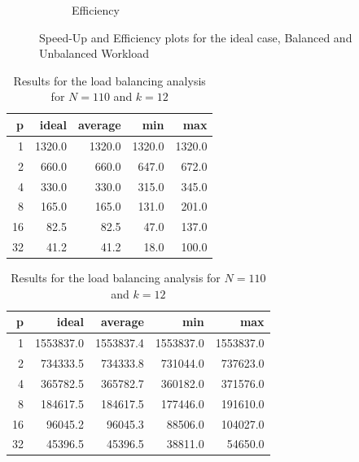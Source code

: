 \documentclass[letterpaper,twoside,11pt]{article}
\begin{document}
\begin{multicols}{2}
\begin{figure}
\begin{subfigure}{.5\textwidth}
    \caption{Efficiency}
    \label{fig:Efficiency}
  \end{subfigure}
  \caption{Speed-Up and Efficiency plots for the ideal case, Balanced and Unbalanced Workload}
\end{figure}

\begin{table}[t]
	\null\hfill
    \begin{subtable}{.45\linewidth}
        \begin{tabular}{*{5}{r}}
        \textbf{p} &  \textbf{ideal} & \textbf{average} &       \textbf{min} &       \textbf{max} \\
            \midrule
            1 &     1320.0 &    1320.0 &    1320.0 &    1320.0\\
            2 &      660.0 &     660.0 &     647.0 &     672.0\\
            4 &      330.0 &     330.0 &     315.0 &     345.0\\
            8 &      165.0 &     165.0 &     131.0 &     201.0\\
            16 &       82.5 &      82.5 &      47.0 &     137.0\\
            32 &       41.2 &      41.2 &      18.0 &     100.0\\
            
        \end{tabular}
        \caption{Load balancing of systems}
        \label{tab:Load_systems}
    \end{subtable}%
   	\hfill
    \begin{subtable}{.5\linewidth}
        \begin{tabular}{*{5}{r}}
        \textbf{p} & \textbf{ideal} & \textbf{average} &       \textbf{min} &       \textbf{max} \\
            \midrule
            1 &  1553837.0 & 1553837.4 & 1553837.0 & 1553837.0\\
            2 &   734333.5 &  734333.8 &  731044.0 &  737623.0\\
            4 &   365782.5 &  365782.7 &  360182.0 &  371576.0\\
            8 &   184617.5 &  184617.5 &  177446.0 &  191610.0\\
            16 &    96045.2 &   96045.3 &   88506.0 &  104027.0\\
            32 &    45396.5 &   45396.5 &   38811.0 &   54650.0\\
        \end{tabular}
        \caption{Load balancing of symbols}
        \label{tab:Load_symbols}
    \end{subtable}%
    \hfil\null
    \caption{Results for the load balancing analysis for $N = 110$ and $k = 12$}
    \label{tab:Load}
\end{table}


\end{multicols}
\end{document}
